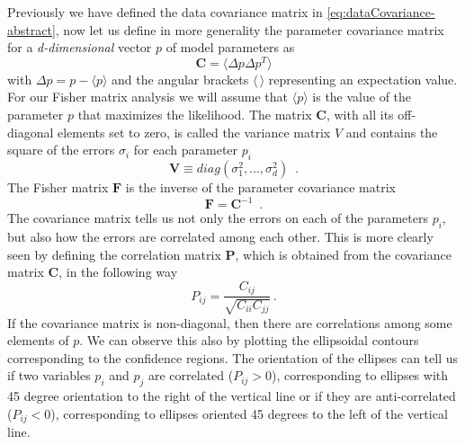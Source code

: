 Previously we have defined the data covariance matrix in \cref{eq:dataCovariance-abstract}, now let us define in more generality the
parameter covariance matrix for a \emph{d-dimensional }vector
$p$ of model parameters as
\begin{equation}
\mathbf{C}=\langle \Delta p \Delta p^{T} \rangle\label{eq:covariance_def}
\end{equation}
with $\Delta p = p - \langle p \rangle$ and the angular brackets $\langle \, \rangle$ representing an expectation value.
For our Fisher matrix analysis we will assume that $\langle p \rangle$ is the value of the parameter $p$ that maximizes the likelihood.
The matrix $\mathbf{C}$, with all its off-diagonal elements set to zero, is called the variance matrix $V$ and contains the
square of the errors $\sigma_{i}$ for each parameter
$p_{i}$
\begin{equation}
\mathbf{V} \equiv diag(\sigma_{1}^{2},...,\sigma_{d}^{2})\,\,\,.
\end{equation}
The Fisher matrix $\mathbf{F}$ is the inverse of the parameter covariance matrix
\begin{equation}
\mathbf F= \mathbf C^{-1}\,\,\,.
\end{equation}
The covariance matrix tells us not only the errors on each of the parameters $p_i$,
but also how the errors are correlated among each other. This is more clearly seen by defining
the correlation matrix $\mathbf P$, which is obtained from the covariance matrix
$\mathbf C$, in the following way
\begin{equation}
P_{ij}=\frac{C_{ij}}{\sqrt{C_{ii}C_{jj}}} \, . \label{eq:correlation_def}
\end{equation}
If the covariance matrix is non-diagonal, then there are correlations
among some elements of $p$. We can observe this also by plotting
the ellipsoidal contours corresponding to the confidence regions. The orientation of the ellipses can
tell us if two variables $p_{i}$ and $p_{j}$ are correlated ($P_{ij}>0$),
corresponding to ellipses with 45 degree orientation to the right of the vertical
line or if they are anti-correlated ($P_{ij}<0$), corresponding to ellipses oriented 45
degrees to the left of the vertical line.

